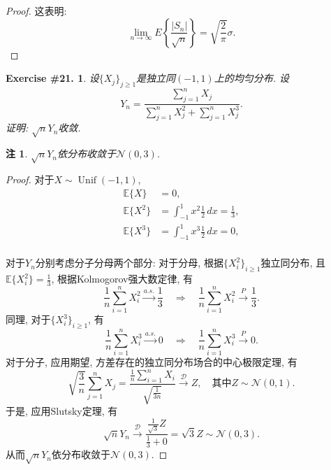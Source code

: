 \documentclass[UTF8, a4paper]{article}
\newtheorem{exercise}{Exercise \#21.}
\newtheorem*{remark}{注}
\begin{document}
\begin{proof}
这表明:
$$
\lim _{n \rightarrow \infty} E\left\{\frac{\left|S_n\right|}{\sqrt{n}}\right\}=\sqrt{\frac{2}{\pi}} \sigma .
$$


\end{proof}



\begin{framed}
\begin{exercise}
设\(\{X_j\}_{j\geq 1}\)是独立同\((-1, 1)\)上的均匀分布.
设 
$$
Y_n=\frac{\sum_{j=1}^n X_j}{\sum_{j=1}^n X_j^2+\sum_{j=1}^n X_j^3} .
$$
证明: \(\sqrt{n}Y_n\)收敛.
\end{exercise}
\end{framed}
\begin{remark}
\(\sqrt{n}Y_n\)依分布收敛于\(\mathcal{N}(0,3)\).
\end{remark}

\begin{proof}
对于\(X \sim \operatorname{Unif}(-1, 1)\), 
\begin{align*}
    \mathbb{E}\{X\} &= 0,\\
    \mathbb{E}\{X^2\} &= \int_{-1}^{1} x^2 \frac{1}{2} \,dx = \frac{1}{3},\\
    \mathbb{E}\{X^3\} &= \int_{-1}^{1} x^3 \frac{1}{2} \,dx = 0,\\
\end{align*}


对于\(Y_n\)分别考虑分子分母两个部分: 
对于分母, 
根据\(\{X_i^2\}_{i\geq 1}\)独立同分布, 且\(\mathbb{E}\{X_i^2\} = \frac{1}{3}\), 根据Kolmogorov强大数定律, 有
$$
\frac{1}{n}\sum_{i=1}^{n}X_i^2 \xrightarrow{a.s.} \frac{1}{3} \quad \Rightarrow \quad \frac{1}{n}\sum_{i=1}^{n}X_i^2 \xrightarrow{P} \frac{1}{3}.
$$
同理, 对于\(\{X_i^3\}_{i\geq 1}\), 有
$$
\frac{1}{n}\sum_{i=1}^{n}X_i^3 \xrightarrow{a.s.} 0 \quad \Rightarrow \quad \frac{1}{n}\sum_{i=1}^{n}X_i^3 \xrightarrow{P} 0.
$$
对于分子, 应用期望, 方差存在的独立同分布场合的中心极限定理, 有
$$
\sqrt{\frac{3}{n}} \sum_{j=1}^{n}X_j = \frac{\frac{1}{n}\sum_{i=1}^{n}X_i }{\sqrt{\frac{1}{3n}}}\xrightarrow{\mathcal{D}} Z, \quad \text{其中} Z \sim \mathcal{N}(0, 1).
$$
于是, 应用Slutsky定理, 有
$$
\sqrt{n}Y_n \xrightarrow{\mathcal{D}} \frac{\frac{1}{\sqrt{3}}Z}{\frac{1}{3} + 0} = \sqrt{3}Z \sim \mathcal{N}(0, 3).
$$
从而\(\sqrt{n}Y_n\)依分布收敛于\(\mathcal{N}(0, 3)\).
\end{proof}
\end{document}

